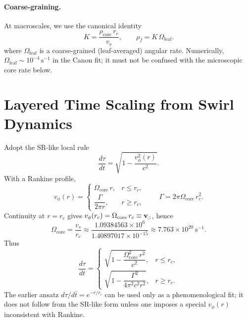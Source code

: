 \documentclass[11pt]{article}
\newcommand{\swirlarrow}{%
	\mathchoice{\mkern-2mu\scriptstyle\boldsymbol{\circlearrowleft}}%
	{\mkern-2mu\scriptstyle\boldsymbol{\circlearrowleft}}%
	{\mkern-2mu\scriptscriptstyle\boldsymbol{\circlearrowleft}}%
	{\mkern-2mu\scriptscriptstyle\boldsymbol{\circlearrowleft}}%
}
\newcommand{\vswirl}{\mathbf{v}_{\swirlarrow}}
\newcommand{\vscore}{v_s}                                %
\newcommand{\rhoF}{\rho_{\!f}}                           %
\newcommand{\rhoC}{\rho_{\mathrm{core}}} %
\begin{document}
		\paragraph{Coarse-graining.}
		At macroscales, we use the canonical identity
		\[
			K=\frac{\rhoC\,r_c}{\vscore},\qquad \rhoF=K\,\Omega_{\text{leaf}}.
		\]
		where $\Omega_{\text{leaf}}$ is a coarse-grained (leaf-averaged) angular rate. Numerically, $\Omega_{\text{leaf}}\sim 10^{-4}\,\mathrm{s^{-1}}$ in the Canon fit; it must not be confused with the microscopic core rate below.

	\section{Layered Time Scaling from Swirl Dynamics}
		Adopt the SR-like local rule
		\[
			\frac{d\tau}{dt}=\sqrt{1-\frac{v_\phi^{2}(r)}{c^{2}}}.
		\]
		With a Rankine profile,
		\[
			v_\phi(r)=
			\begin{cases}
				\Omega_{\text{core}}\,r, & r\le r_c,\\[4pt]
				\dfrac{\Gamma}{2\pi r}, & r\ge r_c,
			\end{cases}
			\qquad \Gamma=2\pi\Omega_{\text{core}}\,r_c^{2}.
		\]
		Continuity at $r=r_c$ gives $v_\phi(r_c)=\Omega_{\text{core}}\,r_c\equiv \vswirl$, hence
		\[
			\Omega_{\text{core}}=\frac{\vscore}{r_c}\approx \frac{1.09384563\times 10^{6}}{1.40897017\times 10^{-15}}
			\approx 7.763\times 10^{20}\ \mathrm{s^{-1}}.
		\]
		Thus
		\[
			\frac{d\tau}{dt}=
			\begin{cases}
				\sqrt{1-\dfrac{\Omega_{\text{core}}^{2}\,r^{2}}{c^{2}}}, & r\le r_c,\\[6pt]
				\sqrt{1-\dfrac{\Gamma^{2}}{4\pi^{2}c^{2}r^{2}}}, & r\ge r_c.
			\end{cases}
		\]
		The earlier ansatz $d\tau/d\bar t=e^{-r/r_c}$ can be used only as a phenomenological fit; it does not follow from the SR-like form unless one imposes a special $v_\phi(r)$ inconsistent with Rankine.

	\ifdefined\standalonechapter\else
	
	
\end{document}
